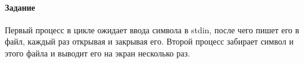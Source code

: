 \paragraph{Задание}
Первый процесс в цикле ожидает ввода символа в stdin, после чего пишет его в файл, каждый раз открывая и закрывая его.
Второй процесс забирает символ и этого файла и выводит его на экран несколько раз.




